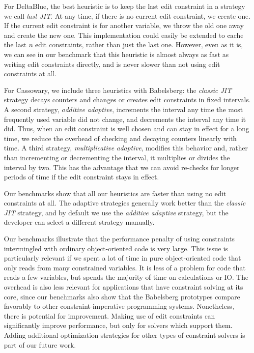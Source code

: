 For DeltaBlue, the best heuristic is to keep the last edit constraint in a
strategy we call \emph{last JIT}. At any time, if there is no current edit
constraint, we create one. If the current edit constraint is for another
variable, we throw the old one away and create the new one. This implementation
could easily be extended to cache the last $n$ edit constraints, rather than
just the last one. However, even as it is, we can see in our benchmark that this
heuristic is almost always as fast as writing edit constraints directly, and is
never slower than not using edit constraints at all.

For Cassowary, we include three heuristics with Babelsberg: the \emph{classic
  JIT} strategy decays counters and changes or creates edit constraints in fixed
intervals. A second strategy, \emph{additive adaptive}, increments the interval
any time the most frequently used variable did not change, and decrements the
interval any time it did. Thus, when an edit constraint is well chosen and can
stay in effect for a long time, we reduce the overhead of checking and decaying
counters linearly with time. A third strategy, \emph{multiplicative adaptive},
modifies this behavior and, rather than incrementing or decrementing the
interval, it multiplies or divides the interval by two. This has the advantage
that we can avoid re-checks for longer periods of time if the edit constraint
stays in effect.

Our benchmarks show that all our heuristics are faster than using no edit
constraints at all. The adaptive strategies generally work better than the
\emph{classic JIT} strategy, and by default we use the \emph{additive adaptive}
strategy, but the developer can select a different strategy manually.

\SummarySep

Our benchmarks illustrate that the performance penalty of using constraints
intermingled with ordinary object-oriented code is very large. This issue is
particularly relevant if we spent a lot of time in pure object-oriented code
that only reads from many constrained variables. It is less of a problem for
code that reads a few variables, but spends the majority of time on calculations
or IO. The overhead is also less relevant for applications that have constraint
solving at its core, since our benchmarks also show that the Babelsberg
prototypes compare favorably to other constraint-imperative programming
systems. Nonetheless, there is potential for improvement. Making use of edit
constraints can significantly improve performance, but only for solvers which
support them. Adding additional optimization strategies for other types of
constraint solvers is part of our future work.


